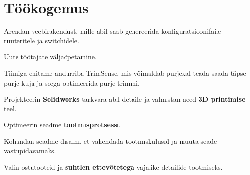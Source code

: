 \documentclass[letterpaper]{deedy-resume} %
\begin{document}
\hfill
%
%
\begin{minipage}[t]{0.66\textwidth} %


\section{Töökogemus}


\vspace{\topsep} %
\begin{tightitemize}
  \item Arendan veebirakendust, mille abil saab genereerida konfiguratsioonifaile ruuteritele ja switchidele.
  \item Uute töötajate väljaõpetamine.
\end{tightitemize}

\sectionspace %



\begin{tightitemize}
  \item Tiimiga ehitame andurriba TrimSense, mis võimaldab purjekal teada saada täpse purje kuju ja seega optimeerida purje trimmi.
  \item Projekteerin \textbf{Solidworks} tarkvara abil detaile ja valmistan need \textbf{3D printimise} teel.
  \item Optimeerin seadme \textbf{tootmisprotsessi}.
  \item Kohandan seadme disaini, et vähendada tootmiskulusid ja muuta seade vastupidavamaks.
  \item Valin ostutooteid ja \textbf{suhtlen ettevõtetega} vajalike detailide tootmiseks.
\end{tightitemize}


\end{minipage}
\end{document}
